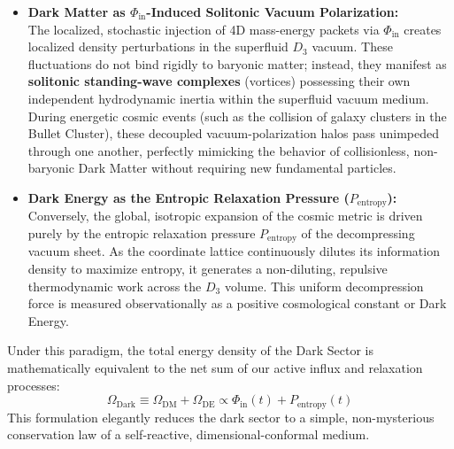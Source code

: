\documentclass[11pt,a4paper]{article}
\theoremstyle{plain}
\theoremstyle{definition}
\theoremstyle{remark}
\begin{document}
\begin{itemize}
    \item \textbf{Dark Matter as $\Phi_{\text{in}}$-Induced Solitonic Vacuum Polarization:} \\
    The localized, stochastic injection of 4D mass-energy packets via $\Phi_{\text{in}}$ creates localized density perturbations in the superfluid $D_3$ vacuum. These fluctuations do not bind rigidly to baryonic matter; instead, they manifest as \textbf{solitonic standing-wave complexes} (vortices) possessing their own independent hydrodynamic inertia within the superfluid vacuum medium. During energetic cosmic events (such as the collision of galaxy clusters in the Bullet Cluster), these decoupled vacuum-polarization halos pass unimpeded through one another, perfectly mimicking the behavior of collisionless, non-baryonic Dark Matter without requiring new fundamental particles.
    \item \textbf{Dark Energy as the Entropic Relaxation Pressure ($P_{\text{entropy}}$):} \\
    Conversely, the global, isotropic expansion of the cosmic metric is driven purely by the entropic relaxation pressure $P_{\text{entropy}}$ of the decompressing vacuum sheet. As the coordinate lattice continuously dilutes its information density to maximize entropy, it generates a non-diluting, repulsive thermodynamic work across the $D_3$ volume. This uniform decompression force is measured observationally as a positive cosmological constant or Dark Energy.
\end{itemize}

Under this paradigm, the total energy density of the Dark Sector is mathematically equivalent to the net sum of our active influx and relaxation processes:
\begin{equation}
\Omega_{\text{Dark}} \equiv \Omega_{\text{DM}} + \Omega_{\text{DE}} \propto \Phi_{\text{in}}(t) + P_{\text{entropy}}(t)
\end{equation}
This formulation elegantly reduces the dark sector to a simple, non-mysterious conservation law of a self-reactive, dimensional-conformal medium.
\end{document}
